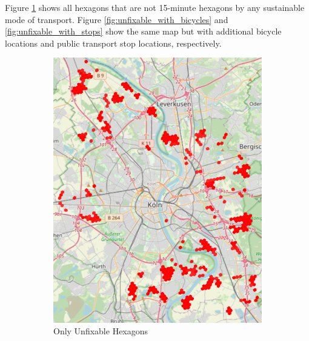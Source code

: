 Figure \ref{fig:only_unfixable_hexagons} shows all hexagons that are not 15-minute hexagons by any sustainable mode of transport.
Figure \ref{fig:unfixable_with_bicycles} and \ref{fig:unfixable_with_stops} show the same map but with additional bicycle locations and public transport stop locations, respectively.
\begin{figure}
     \centering
     \begin{subfigure}[b]{0.30\textwidth}
         \centering
         \includegraphics[width=\textwidth]{Figures/results/problematic_hexagons/unfixable.png}
         \caption{Only Unfixable Hexagons}
         \label{fig:only_unfixable_hexagons}
     \end{subfigure}
     \hfill
     \begin{subfigure}[b]{0.30\textwidth}
         \centering

\end{subfigure}
\end{figure}
